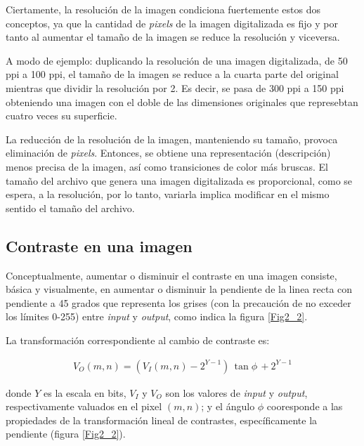 %
Ciertamente, la resoluci\'on de la imagen condiciona fuertemente estos dos conceptos, ya que la cantidad de \textit{pixels} de la imagen digitalizada es
fijo y por tanto al aumentar el tama\~no de la imagen se reduce la resoluci\'on y viceversa.
%

%
A modo de ejemplo: duplicando la resoluci\'on de una imagen digitalizada, de 50 ppi a 100 ppi, el tama\~no de la imagen se reduce a la cuarta parte del
original mientras que dividir la resoluci\'on por 2. Es decir, se pasa de 300 ppi a 150 ppi obteniendo una imagen con el doble de las dimensiones originales
que represebtan cuatro veces su superficie.
%

%
La reducci\'on de la resoluci\'on de la imagen, manteniendo su tama\~no, provoca eliminaci\'on de \textit{pixels}.
%
Entonces, se obtiene una representaci\'on (descripci\'on) menos precisa de la imagen, as\'i como transiciones de color m\'as bruscas.
%
El tama\~no del archivo que genera una imagen digitalizada es proporcional, como se espera, a la resoluci\'on, por lo tanto, variarla implica modificar
en el mismo sentido el tama\~no del archivo.

\subsection{Contraste en una imagen}

Conceptualmente, aumentar o disminuir el contraste en una imagen consiste, b\'asica y visualmente, en aumentar o disminuir la pendiente de la linea recta
con pendiente a 45 grados que representa los grises (con la precauci\'on de no exceder los l\'imites 0-255) entre \textit{input} y \textit{output}, como
indica la figura \ref{Fig2_2}.
%

%
La transformaci\'on correspondiente al cambio de contraste es:

\begin{eqnarray}
	V_{O}(m, n) = \left( V_{I}(m, n) - 2^{Y - 1} \right) \, \tan{\phi} \, + 2^{Y - 1}
\label{EqXXV}
\end{eqnarray}

donde $Y$ es la escala en bits, $V_{I}$ y $V_{O}$ son los valores de \textit{input} y \textit{output}, respectivamente valuados en el pixel $(m, n)$; y el \'angulo $\phi$ cooresponde a
las propiedades de la transformaci\'on lineal de contrastes, espec\'ificamente la pendiente (figura \ref{Fig2_2}).

